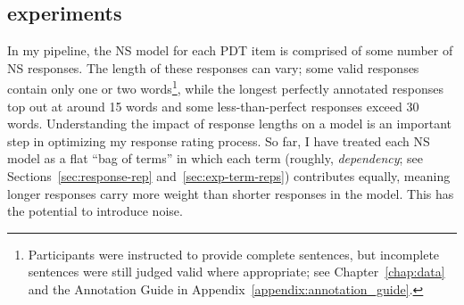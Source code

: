 \subsection{ experiments}
\label{sec:exp-term-norm}

In my pipeline, the NS model for each PDT item is comprised of some number of NS responses.  The length of these responses can vary; some valid responses contain only one or two words\footnote{Participants were instructed to provide complete sentences, but incomplete sentences were still judged valid where appropriate; see Chapter~\ref{chap:data} and the Annotation Guide in Appendix~\ref{appendix:annotation_guide}.}, while the longest perfectly annotated responses top out at around 15 words and some less-than-perfect responses exceed 30 words. Understanding the impact of response lengths on a model is an important step in optimizing my response rating process. So far, I have treated each NS model as a flat ``bag of terms'' in which each term (roughly, \textit{dependency}; see Sections~\ref{sec:response-rep} and~\ref{sec:exp-term-reps}) contributes equally, meaning longer responses carry more weight than shorter responses in the model. This has the potential to introduce noise. 

